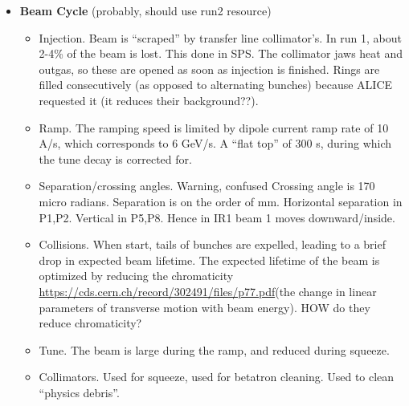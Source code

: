 \begin{itemize}
    \item \textbf{Beam Cycle} (probably, should use run2 resource) \cite{lhcRun1}
    \begin{itemize}
        \item Injection. Beam is ``scraped'' by transfer line collimator's. In run 1, about 2-4\% of the beam is lost. This done in SPS. The collimator jaws heat and outgas, so these are opened as soon as injection is finished. Rings are filled consecutively (as opposed to alternating bunches) because ALICE requested it (it reduces their background??). \cite{lhcRun1}
        \item Ramp. The ramping speed is limited by dipole current ramp rate of 10 A/s, which corresponds to 6 GeV/s. A ``flat top'' of 300 s, during which the tune decay is corrected for. \cite{lhcRun1}
        \item Separation/crossing angles. {\color{red} Warning, confused} Crossing angle is 170 micro radians. Separation is on the order of mm. Horizontal separation in P1,P2. Vertical in P5,P8. Hence in IR1 beam 1 moves downward/inside. \cite{lhcRun1}
        \item Collisions. When start, tails of bunches are expelled, leading to a brief drop in expected beam lifetime. The expected lifetime of the beam is optimized by reducing the chromaticity {\color{blue} \url{https://cds.cern.ch/record/302491/files/p77.pdf}(the change in linear parameters of transverse motion with beam energy).} HOW do they reduce chromaticity? \cite{lhcRun1}
        \item Tune. The beam is large during the ramp, and reduced during squeeze. \cite{lhcRun1}
        \item Collimators. Used for squeeze, used for betatron cleaning. Used to clean ``physics debris''. \cite{lhcRun1}
    \end{itemize}
\end{itemize}

